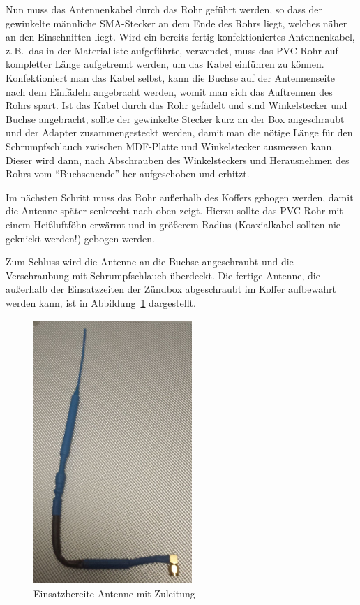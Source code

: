 \documentclass[paper=a4, parskip, numbers=noenddot, toc=listof, headsepline]{scrbook}
\begin{document}
						Nun muss das Antennenkabel durch das Rohr geführt werden, so dass der gewinkelte männliche SMA-Stecker an dem Ende des Rohrs liegt, welches näher an den Einschnitten liegt. Wird ein bereits fertig konfektioniertes Antennenkabel, z.\,B.\, das in der Materialliste aufgeführte, verwendet, muss das PVC-Rohr auf kompletter Länge aufgetrennt werden, um das Kabel einführen zu können. Konfektioniert man das Kabel selbst, kann die Buchse auf der Antennenseite nach dem Einfädeln angebracht werden, womit man sich das Auftrennen des Rohrs spart. Ist das Kabel durch das Rohr gefädelt und sind Winkelstecker und Buchse angebracht, sollte der gewinkelte Stecker kurz an der Box angeschraubt und der Adapter zusammengesteckt werden, damit man die nötige Länge für den Schrumpfschlauch zwischen MDF-Platte und Winkelstecker ausmessen kann. Dieser wird dann, nach Abschrauben des Winkelsteckers und Herausnehmen des Rohrs vom \enquote{Buchsenende} her aufgeschoben und erhitzt.

						Im nächsten Schritt muss das Rohr außerhalb des Koffers gebogen werden, damit die Antenne später senkrecht nach oben zeigt. Hierzu sollte das PVC-Rohr mit einem Heißluftföhn erwärmt und in größerem Radius (Koaxialkabel sollten nie geknickt werden!) gebogen werden.

						Zum Schluss wird die Antenne an die Buchse angeschraubt und die Verschraubung mit Schrumpfschlauch überdeckt. Die fertige Antenne, die außerhalb der Einsatzzeiten der Zündbox abgeschraubt im Koffer aufbewahrt werden kann, ist in Abbildung~\ref{fig:antennefertig} dargestellt.

						\begin{figure}
							\centering
							\includegraphics[width=6cm, height=10cm]{Bilder/antennefertig}
							\caption{Einsatzbereite Antenne mit Zuleitung}
							\label{fig:antennefertig}
						\end{figure}
\end{document}
